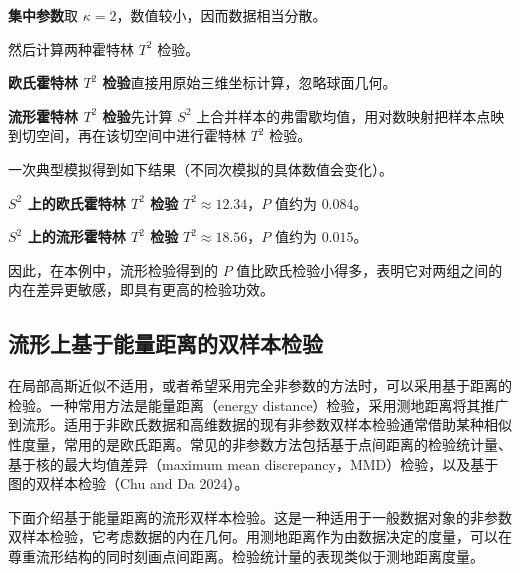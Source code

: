 \begin{enumerate}
  \textbf{集中参数}取 $\kappa=2$，数值较小，因而数据相当分散。

  然后计算两种霍特林 $T^2$ 检验。\par
  \textbf{欧氏霍特林 $T^2$ 检验}直接用原始三维坐标计算，忽略球面几何。\par
  \textbf{流形霍特林 $T^2$ 检验}先计算 $S^2$ 上合并样本的弗雷歇均值，用对数映射把样本点映到切空间，再在该切空间中进行霍特林 $T^2$ 检验。

  一次典型模拟得到如下结果（不同次模拟的具体数值会变化）。\par
  \textbf{$S^2$ 上的欧氏霍特林 $T^2$ 检验} $T^2\approx 12.34$，$P$ 值约为 $0.084$。\par
  \textbf{$S^2$ 上的流形霍特林 $T^2$ 检验} $T^2\approx 18.56$，$P$ 值约为 $0.015$。

  因此，在本例中，流形检验得到的 $P$ 值比欧氏检验小得多，表明它对两组之间的内在差异更敏感，即具有更高的检验功效。
\end{enumerate}

\subsection{流形上基于能量距离的双样本检验}

在局部高斯近似不适用，或者希望采用完全非参数的方法时，可以采用基于距离的检验。一种常用方法是能量距离（energy distance）检验，采用测地距离将其推广到流形。适用于非欧氏数据和高维数据的现有非参数双样本检验通常借助某种相似性度量，常用的是欧氏距离。常见的非参数方法包括基于点间距离的检验统计量、基于核的最大均值差异（maximum mean discrepancy，MMD）检验，以及基于图的双样本检验（Chu and Da 2024）。

下面介绍基于能量距离的流形双样本检验。这是一种适用于一般数据对象的非参数双样本检验，它考虑数据的内在几何。用测地距离作为由数据决定的度量，可以在尊重流形结构的同时刻画点间距离。检验统计量的表现类似于测地距离度量。

